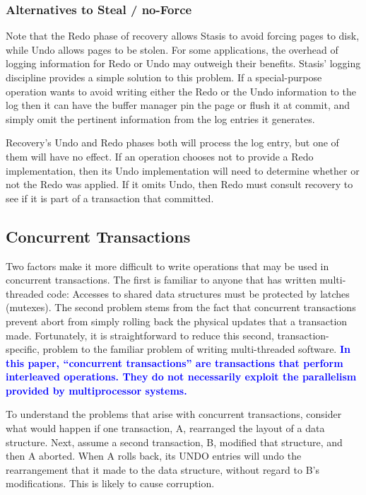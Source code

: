 \documentclass[letterpaper,twocolumn,10pt]{article}
\newcommand{\yad}{Stasis\xspace}
\newcommand{\yads}{Stasis'\xspace}
\newcommand{\diff}[1]{\textcolor{blue}{\bf #1}}
\begin{document}
\subsubsection{Alternatives to Steal / no-Force}

Note that the Redo phase of recovery allows \yad to avoid forcing
pages to disk, while Undo allows pages to be stolen.  For some
applications, the overhead of logging information for Redo or Undo may
outweigh their benefits.  \yads logging discipline provides a simple
solution to this problem.  If a special-purpose operation wants to
avoid writing either the Redo or the Undo information to the log then
it can have the buffer manager pin the page or flush it at commit, and
simply omit the pertinent information from the log entries it
generates.

Recovery's Undo and Redo phases both will process the log entry, but
one of them will have no effect.  If an operation chooses not to
provide a Redo implementation, then its Undo implementation will need
to determine whether or not the Redo was applied.  If it omits Undo,
then Redo must consult recovery to see if it is part of a transaction that
committed.

\subsection{Concurrent Transactions}

Two factors make it more difficult to write operations that may be
used in concurrent transactions.  The first is familiar to anyone that
has written multi-threaded code: Accesses to shared data structures
must be protected by latches (mutexes).  The second problem stems from
the fact that concurrent transactions prevent abort from simply
rolling back the physical updates that a transaction made.
Fortunately, it is straightforward to reduce this second,
transaction-specific, problem to the familiar problem of writing
multi-threaded software.  \diff{In this paper, ``concurrent transactions''
are transactions that perform interleaved operations.  They do not
necessarily exploit the parallelism provided by multiprocessor
systems.}

To understand the problems that arise with concurrent transactions,
consider what would happen if one transaction, A, rearranged the
layout of a data structure.  Next, assume a second transaction, B,
modified that structure, and then A aborted.  When A rolls back, its
UNDO entries will undo the rearrangement that it made to the data
structure, without regard to B's modifications.  This is likely to
cause corruption.
\end{document}
